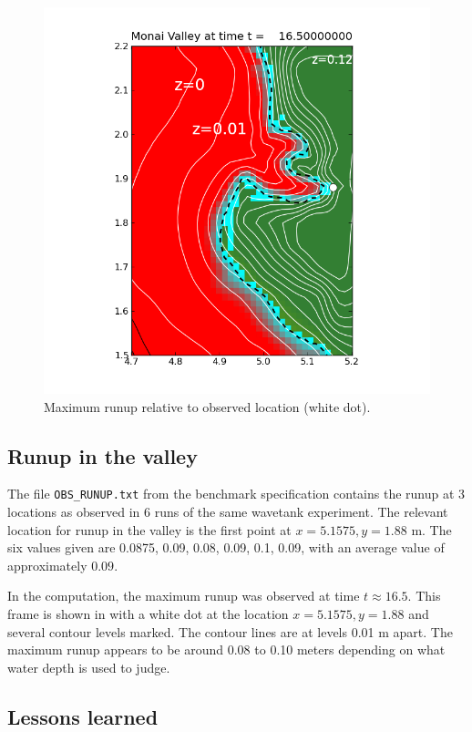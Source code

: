 \begin{figure}[ht]
\hfil\includegraphics[width=5.0in]{bp7/figs423/contours.png}\hfil
\caption{\label{fig:bp7runup} 
Maximum runup relative to observed location (white dot).
  }
\end{figure}

\subsection{Runup in the valley}
The file {\tt OBS\_RUNUP.txt} from the benchmark specification contains
the runup at 3 locations as observed in 6 runs of the same wavetank
experiment.  The relevant location for runup in the valley is the first
point at $x=5.1575, y=1.88$ m.  The six values given are 0.0875, 0.09,
0.08, 0.09, 0.1, 0.09, with an average value of approximately $0.09$.

In the computation, the maximum runup was observed at time $t\approx 16.5$.
This frame is shown in  with a white dot at the location
$x=5.1575, y=1.88$ and several contour levels marked.  The contour lines are
at levels 0.01 m apart.  The maximum runup appears to be around 0.08 to 0.10
meters depending on what water depth is used to judge.

\subsection{Lessons learned}





